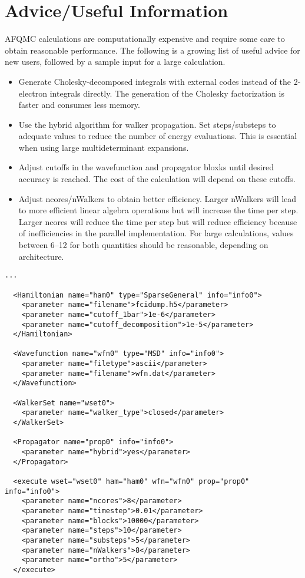 \section{Advice/Useful Information}

AFQMC calculations are computationally expensive and require some care to obtain reasonable performance.
The following is a growing list of useful advice for new users, followed by a sample input for a large calculation.
\begin{itemize}
\item Generate Cholesky-decomposed integrals with external codes instead of the 2-electron integrals directly. The generation of the Cholesky factorization is faster and consumes less memory. 
\item Use the hybrid algorithm for walker propagation. Set steps/substeps to adequate values to reduce the number of energy evaluations. This is essential when using large multideterminant expansions.
\item Adjust cutoffs in the wavefunction and propagator bloxks until desired accuracy is reached. The cost of the calculation will depend on these cutoffs.
\item Adjust ncores/nWalkers to obtain better efficiency. Larger nWalkers will lead to more efficient linear algebra operations but will increase the time per step. Larger ncores will reduce the time per step but will reduce efficiency because of inefficiencies in the parallel implementation. For large calculations, values between 6--12 for both quantities should be reasonable, depending on architecture. 
\end{itemize}

\begin{lstlisting}[style=QMCPXML,caption=Example of sections of an AFQMC input file for a large calculation.]
...

  <Hamiltonian name="ham0" type="SparseGeneral" info="info0">
    <parameter name="filename">fcidump.h5</parameter>
    <parameter name="cutoff_1bar">1e-6</parameter>
    <parameter name="cutoff_decomposition">1e-5</parameter>
  </Hamiltonian>

  <Wavefunction name="wfn0" type="MSD" info="info0">
    <parameter name="filetype">ascii</parameter>
    <parameter name="filename">wfn.dat</parameter>
  </Wavefunction>

  <WalkerSet name="wset0">
    <parameter name="walker_type">closed</parameter>
  </WalkerSet>

  <Propagator name="prop0" info="info0">
    <parameter name="hybrid">yes</parameter>
  </Propagator>

  <execute wset="wset0" ham="ham0" wfn="wfn0" prop="prop0" info="info0">
    <parameter name="ncores">8</parameter>
    <parameter name="timestep">0.01</parameter>
    <parameter name="blocks">10000</parameter>
    <parameter name="steps">10</parameter>
    <parameter name="substeps">5</parameter>
    <parameter name="nWalkers">8</parameter>
    <parameter name="ortho">5</parameter>
  </execute>
\end{lstlisting}
